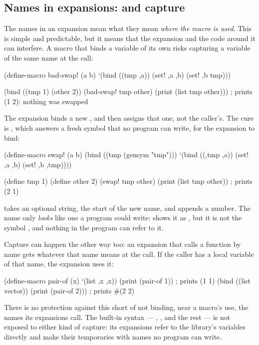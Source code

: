 \subsection{Names in expansions:  and capture}
\label{sec:ext-hygiene}

The names in an expansion mean what they mean \emph{where the macro is
used}. This is simple and predictable, but it means that the expansion
and the code around it can interfere. A macro that binds a variable of
its own risks capturing a variable of the same name at the call:

\begin{dylan}
(define-macro bad-swap! (a b)
  `(bind ((tmp ,a)) (set! ,a ,b) (set! ,b tmp)))

(bind ((tmp 1) (other 2))
  (bad-swap! tmp other)
  (print (list tmp other)))
; prints (1 2): nothing was swapped
\end{dylan}

The expansion binds a new , and  then
assigns that one, not the caller's. The cure is , which
answers a fresh symbol that no program can write, for the expansion to
bind:

\begin{dylan}
(define-macro swap! (a b)
  (bind ((tmp (gensym "tmp")))
    `(bind ((,tmp ,a))
       (set! ,a ,b)
       (set! ,b ,tmp))))

(define tmp 1)
(define other 2)
(swap! tmp other)
(print (list tmp other))      ; prints (2 1)
\end{dylan}

 takes an optional string, the start of the new name, and
appends a number. The name only \emph{looks} like one a program could
write:  shows it as , but it is not the symbol
, and nothing in the program can refer to it.

Capture can happen the other way too: an expansion that calls a function
by name gets whatever that name means at the call. If the caller has a
local variable of that name, the expansion uses it:

\begin{dylan}
(define-macro pair-of (x) `(list ,x ,x))
(print (pair-of 1))                     ; prints (1 1)
(bind ((list vector))
  (print (pair-of 2)))                  ; prints #(2 2)
\end{dylan}

\noindent There is no protection against this short of not binding, near
a macro's use, the names its expansions call. The built-in syntax ---
, ,  and the rest --- is not exposed
to either kind of capture: its expansions refer to the library's
variables directly and make their temporaries with names no program can
write.

